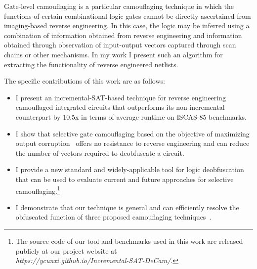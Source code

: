 \documentclass[proposal]{umassthesis}  %
\begin{document}
    Gate-level camouflaging is a particular camouflaging technique in which the functions of certain combinational logic gates cannot be directly ascertained from imaging-based reverse engineering. In this case, the logic may be inferred using a combination of information obtained from reverse engineering and information obtained through observation of input-output vectors captured through scan chains or other mechanisms. In my work I present such an algorithm for extracting the functionality of reverse engineered netlists.

The specific contributions of this work are as follows:

\begin{itemize}


\item {I present an incremental-SAT-based technique for reverse engineering camouflaged integrated circuits that outperforms its non-incremental counterpart by 10.5x in terms of average runtime on ISCAS-85 benchmarks.}

\item I show that selective gate camouflaging based on the objective of maximizing output corruption~\cite{rajendran-13} offers no resistance to reverse engineering and can reduce the number of vectors required to deobfuscate a circuit.


\item I provide a new standard and widely-applicable tool for logic deobfuscation that can be used to evaluate current and future approaches for selective camouflaging.\footnote{The source code of our tool and benchmarks used in this work are released publicly at our project website at \\{\it https://ycunxi.github.io/Incremental-SAT-DeCam/}.}

\item I demonstrate that our technique is general and can efficiently resolve the obfuscated function of three proposed camouflaging techniques~\cite{rajendran-13,malik-obfusgate,chen-2015-dummyWire}.

\end{itemize}
\end{document}
